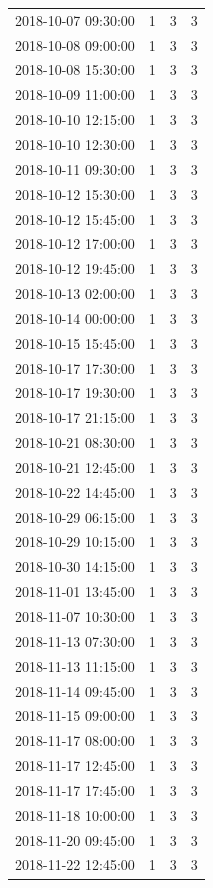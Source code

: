 \begin{tabular}{lrrr}
2018-10-07 09:30:00 & 1 & 3 & 3 \\
2018-10-08 09:00:00 & 1 & 3 & 3 \\
2018-10-08 15:30:00 & 1 & 3 & 3 \\
2018-10-09 11:00:00 & 1 & 3 & 3 \\
2018-10-10 12:15:00 & 1 & 3 & 3 \\
2018-10-10 12:30:00 & 1 & 3 & 3 \\
2018-10-11 09:30:00 & 1 & 3 & 3 \\
2018-10-12 15:30:00 & 1 & 3 & 3 \\
2018-10-12 15:45:00 & 1 & 3 & 3 \\
2018-10-12 17:00:00 & 1 & 3 & 3 \\
2018-10-12 19:45:00 & 1 & 3 & 3 \\
2018-10-13 02:00:00 & 1 & 3 & 3 \\
2018-10-14 00:00:00 & 1 & 3 & 3 \\
2018-10-15 15:45:00 & 1 & 3 & 3 \\
2018-10-17 17:30:00 & 1 & 3 & 3 \\
2018-10-17 19:30:00 & 1 & 3 & 3 \\
2018-10-17 21:15:00 & 1 & 3 & 3 \\
2018-10-21 08:30:00 & 1 & 3 & 3 \\
2018-10-21 12:45:00 & 1 & 3 & 3 \\
2018-10-22 14:45:00 & 1 & 3 & 3 \\
2018-10-29 06:15:00 & 1 & 3 & 3 \\
2018-10-29 10:15:00 & 1 & 3 & 3 \\
2018-10-30 14:15:00 & 1 & 3 & 3 \\
2018-11-01 13:45:00 & 1 & 3 & 3 \\
2018-11-07 10:30:00 & 1 & 3 & 3 \\
2018-11-13 07:30:00 & 1 & 3 & 3 \\
2018-11-13 11:15:00 & 1 & 3 & 3 \\
2018-11-14 09:45:00 & 1 & 3 & 3 \\
2018-11-15 09:00:00 & 1 & 3 & 3 \\
2018-11-17 08:00:00 & 1 & 3 & 3 \\
2018-11-17 12:45:00 & 1 & 3 & 3 \\
2018-11-17 17:45:00 & 1 & 3 & 3 \\
2018-11-18 10:00:00 & 1 & 3 & 3 \\
2018-11-20 09:45:00 & 1 & 3 & 3 \\
2018-11-22 12:45:00 & 1 & 3 & 3 \\

\end{tabular}
